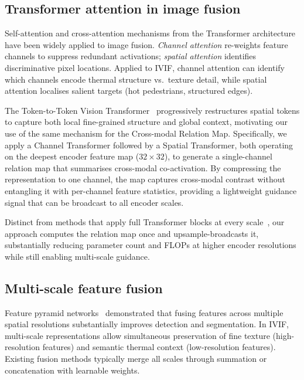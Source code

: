 \documentclass[a4paper,fleqn]{cas-dc}
\begin{document}
\subsection{Transformer attention in image fusion}
\label{sec:rw:transformer}

Self-attention and cross-attention mechanisms from the Transformer
architecture~\cite{t2tvit2021} have been widely applied to image fusion.
\emph{Channel attention} re-weights feature channels to suppress redundant
activations; \emph{spatial attention} identifies discriminative pixel
locations.  Applied to IVIF, channel attention can identify which channels
encode thermal structure vs.\ texture detail, while spatial attention
localises salient targets (hot pedestrians, structured edges).

The Token-to-Token Vision Transformer~\cite{t2tvit2021} progressively
restructures spatial tokens to capture both local fine-grained structure and
global context, motivating our use of the same mechanism for the Cross-modal
Relation Map.  Specifically, we apply a Channel Transformer followed by a
Spatial Transformer, both operating on the deepest encoder feature map
($32{\times}32$), to generate a single-channel relation map that summarises
cross-modal co-activation.  By compressing the representation to one channel,
the map captures cross-modal contrast without entangling it with
per-channel feature statistics, providing a lightweight guidance signal
that can be broadcast to all encoder scales.

Distinct from methods that apply full Transformer blocks at every
scale~\cite{swinfusion2022}, our approach computes the relation map once
and upsample-broadcasts it, substantially reducing parameter count and FLOPs
at higher encoder resolutions while still enabling multi-scale guidance.

\subsection{Multi-scale feature fusion}
\label{sec:rw:multiscale}

Feature pyramid networks~\cite{vgg2015} demonstrated that fusing features
across multiple spatial resolutions substantially improves detection and
segmentation.  In IVIF, multi-scale representations allow simultaneous
preservation of fine texture (high-resolution features) and semantic thermal
context (low-resolution features).  Existing fusion methods typically merge
all scales through summation or concatenation with learnable weights.
\end{document}
